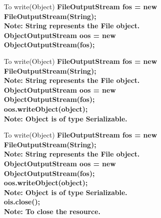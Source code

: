 \documentclass[aspectratio=169,14pt,usenames,dvipsnames]{beamer}
\begin{document}
\begin{frame}{To write(Object)}
\textbf{FileOutputStream fos = new FileOutputStream(String);}\\
\textbf{Note: String represents the File object.}\\
\vspace{1em}
\textbf{ObjectOutputStream oos = new}\\
\textbf{ObjectOutputStream(fos);}\\
\end{frame}

\begin{frame}{To write(Object)}
\textbf{FileOutputStream fos = new FileOutputStream(String);}\\
\textbf{Note: String represents the File object.}\\
\vspace{1em}
\textbf{ObjectOutputStream oos = new}\\
\textbf{ObjectOutputStream(fos);}\\
\vspace{1em}
\textbf{oos.writeObject(object);}\\
\textbf{Note: Object is of type Serializable.}\\
\end{frame}

\begin{frame}{To write(Object)}
\textbf{FileOutputStream fos = new FileOutputStream(String);}\\
\textbf{Note: String represents the File object.}\\
\vspace{1em}
\textbf{ObjectOutputStream oos = new}\\
\textbf{ObjectOutputStream(fos);}\\
\vspace{1em}
\textbf{oos.writeObject(object);}\\
\textbf{Note: Object is of type Serializable.}\\
\vspace{1em}
    \textbf{ois.close();}\\
\textbf{Note: To close the resource.}\\
\end{frame}
\end{document}
